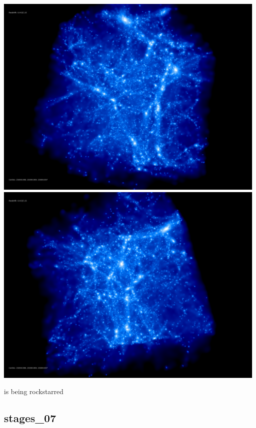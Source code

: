 \includegraphics[scale=0.1]{NGenIC_26214/rotate_00074.jpg} 
\includegraphics[scale=0.1]{NGenIC_26214/rotate_00131.jpg}

is being rockstarred  \\

% 
%
%
%
%
%
%
%

\newpage
\subsection{stages\_07}

